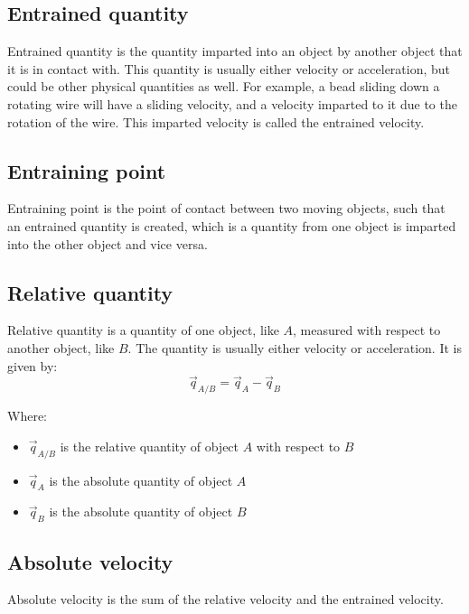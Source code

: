 \documentclass[11pt]{article}
\begin{document}
 \newpage

\subsection{Entrained quantity}
\label{sec:orgc7a3edc}
Entrained quantity is the quantity imparted into an object by another object that it is in contact with. This quantity is usually either velocity or acceleration, but could be other physical quantities as well. For example, a bead sliding down a rotating wire will have a sliding velocity, and a velocity imparted to it due to the rotation of the wire. This imparted velocity is called the entrained velocity.

\subsection{Entraining point}
\label{sec:org040c906}
Entraining point is the point of contact between two moving objects, such that an entrained quantity is created, which is a quantity from one object is imparted into the other object and vice versa.

\subsection{Relative quantity}
\label{sec:orgfb5469e}
Relative quantity is a quantity of one object, like \(A\), measured with respect to another object, like \(B\). The quantity is usually either velocity or acceleration. It is given by:
\[\vec{q}_{A/B} = \vec{q}_A - \vec{q}_B\]

Where:
\begin{itemize}
\item \(\vec{q}_{A/B}\) is the relative quantity of object \(A\) with respect to \(B\)
\item \(\vec{q}_A\) is the absolute quantity of object \(A\)
\item \(\vec{q}_B\) is the absolute quantity of object \(B\)
\end{itemize}

 \newpage

\subsection{Absolute velocity}
\label{sec:org3a12464}
Absolute velocity is the sum of the relative velocity and the entrained velocity.
\end{document}
